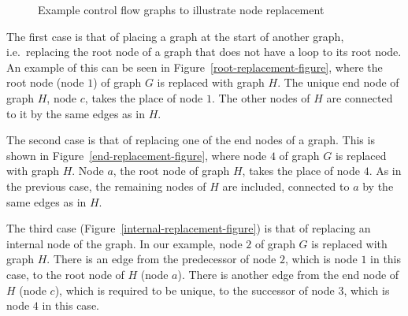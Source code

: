 \begin{figure}
  \begin{center}
    \caption{Example control flow graphs to illustrate node
      replacement}
    \label{G-H-examples-figure}
  \end{center}
\end{figure}

The first case is that of placing a graph at the start of another
graph, i.e.\ replacing the root node of a graph that does not have a
loop to its root node.
An example of this can be seen in
Figure~\ref{root-replacement-figure}, where the root node (node $1$)
of graph $G$ is replaced with graph $H$.
The unique end node of graph $H$, node $c$, takes the place of node
$1$.
The other nodes of $H$ are connected to it by the same edges as in
$H$.

The second case is that of replacing one of the end nodes of a graph.
This is shown in Figure~\ref{end-replacement-figure}, where node $4$
of graph $G$ is replaced with graph $H$.
Node $a$, the root node of graph $H$, takes the place of node $4$.
As in the previous case, the remaining nodes of $H$ are included,
connected to $a$ by the same edges as in $H$.

The third case (Figure~\ref{internal-replacement-figure}) is that of
replacing an internal node of the graph.
In our example, node $2$ of graph $G$ is replaced with graph $H$.
There is an edge from the predecessor of node $2$, which is node $1$
in this case, to the root node of $H$ (node $a$).
There is another edge from the end node of $H$ (node $c$), which is
required to be unique, to the successor of node $3$, which is node $4$
in this case.


